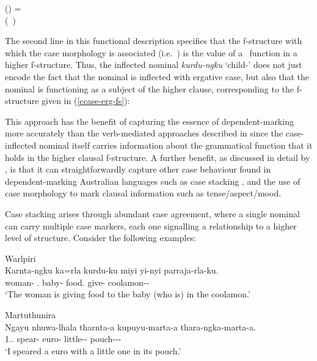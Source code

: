 \documentclass[output=paper,hidelinks]{langscibook}
\begin{document}
\ea
\label{ccase-erg}
(\UP \CASE) = \ERG\\
(\SUBJ\ \UP)\\
\z

The second line in this functional description specifies that the f-structure with which the case morphology is associated (i.e.\ \UP) is the value of a \SUBJ\ function in a higher f-structure.  Thus, the inflected nominal {\it kurdu-ngku} `child-\ERG' does not just encode the fact that the nominal is inflected with ergative case, but also that the nominal is functioning as a subject of the higher clause, corresponding to the f-structure given in (\ref{ccase-erg-fs}):


This approach has the benefit of capturing the essence of dependent-marking more accurately than the verb-mediated approaches described in  since the case-inflected nominal itself carries information about the grammatical function that it holds in the higher clausal f-structure. A further benefit, as discussed in detail by  \citet{nordlinger1998constructive}, is that it can straightforwardly capture other case behaviour found in dependent-marking Australian languages such as case stacking \citep{DE88,Andrews1996}, and the use of case morphology to mark clausal information such as tense{\slash}aspect{\slash}mood.

Case stacking arises through abundant case agreement, where a single nominal can carry multiple case markers, each one signalling a relationship to a higher level of structure. Consider the following examples:

\ea \label{cs-warl} Warlpiri\\
\gll Karnta-ngku	 ka=rla kurdu-ku miyi yi-nyi parraja-rla-ku.\\
{woman-\ERG}	{.\DAT} {baby-\DAT} {food.\ABS} {give-\NPST} {coolamon-\LOC-\DAT}\\
\glt ‘The woman is giving food to the baby (who is) in the coolamon.’	\citep[206]{Simpson1991}
\z

\ea \label{cs-martu} Martuthunira\\
\gll Ngayu	nhuwa-lhala	tharnta-a kupuyu-marta-a thara-ngka-marta-a.\\	
{1.\SG.\NOM} {spear-\PST} {euro-\ACC} {little-\PROP-\ACC} {pouch-\LOC-\PROP-\ACC}\\
\glt `I speared a euro with a little one in its pouch.’ \citep[7]{DE88}
\z
\end{document}
